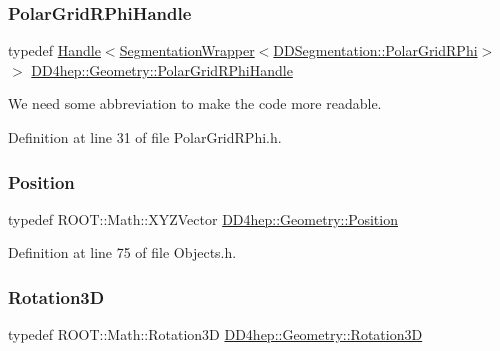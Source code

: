 \subsubsection{\texorpdfstring{Polar\+Grid\+R\+Phi\+Handle}{PolarGridRPhiHandle}}
{\footnotesize\ttfamily typedef \hyperlink{class_d_d4hep_1_1_handle}{Handle}$<$\hyperlink{class_d_d4hep_1_1_geometry_1_1_segmentation_wrapper}{Segmentation\+Wrapper}$<$\hyperlink{class_d_d4hep_1_1_d_d_segmentation_1_1_polar_grid_r_phi}{D\+D\+Segmentation\+::\+Polar\+Grid\+R\+Phi}$>$ $>$ \hyperlink{namespace_d_d4hep_1_1_geometry_a3b5a44856fd99ab92095fea0764485d3}{D\+D4hep\+::\+Geometry\+::\+Polar\+Grid\+R\+Phi\+Handle}}



We need some abbreviation to make the code more readable. 



Definition at line 31 of file Polar\+Grid\+R\+Phi.\+h.

\hypertarget{namespace_d_d4hep_1_1_geometry_a55083902099d03506c6db01b80404900}{}\label{namespace_d_d4hep_1_1_geometry_a55083902099d03506c6db01b80404900} 
\subsubsection{\texorpdfstring{Position}{Position}}
{\footnotesize\ttfamily typedef R\+O\+O\+T\+::\+Math\+::\+X\+Y\+Z\+Vector \hyperlink{namespace_d_d4hep_1_1_geometry_a55083902099d03506c6db01b80404900}{D\+D4hep\+::\+Geometry\+::\+Position}}



Definition at line 75 of file Objects.\+h.

\hypertarget{namespace_d_d4hep_1_1_geometry_a022fecb763315fa2bf39cbb648944a0e}{}\label{namespace_d_d4hep_1_1_geometry_a022fecb763315fa2bf39cbb648944a0e} 
\subsubsection{\texorpdfstring{Rotation3D}{Rotation3D}}
{\footnotesize\ttfamily typedef R\+O\+O\+T\+::\+Math\+::\+Rotation3D \hyperlink{namespace_d_d4hep_1_1_geometry_a022fecb763315fa2bf39cbb648944a0e}{D\+D4hep\+::\+Geometry\+::\+Rotation3D}}

